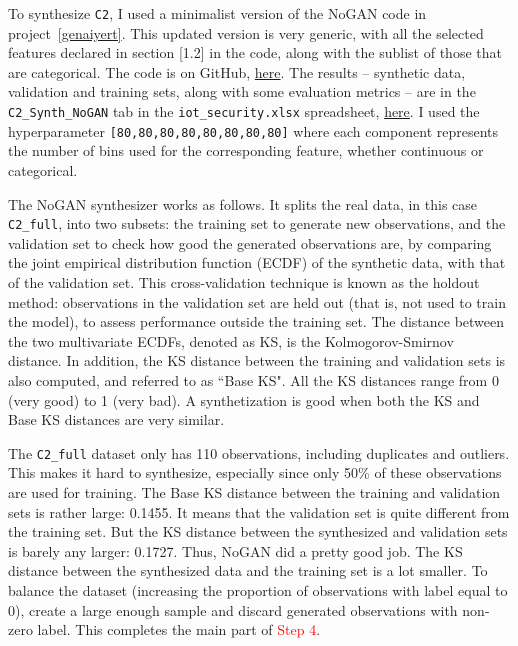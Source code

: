 \documentclass[oneside,10pt]{book}
\begin{document}
To synthesize \texttt{C2}, I used a minimalist version of the NoGAN code in project~\ref{genaiyert}. This updated version is very generic,
 with all the selected features declared in section [1.2] in the code, along with the sublist of those that are categorical. 
  The code is on GitHub, \href{https://github.com/VincentGranville/Main/blob/main/NoGAN_iot.py}{here}.
 The results -- synthetic data, validation and training sets, along with some evaluation metrics -- are
 in the \texttt{C2\_Synth\_NoGAN} tab 
 in the \texttt{iot\_security.xlsx} spreadsheet,
 \href{https://github.com/VincentGranville/Main/blob/main/iot_security.xlsx}{here}. 
I used the \textcolor{index}{hyperparameter} 
\texttt{[80,80,80,80,80,80,80,80]} where each component represents the number of bins used for the corresponding feature,
 whether continuous or categorical.

The NoGAN synthesizer works as follows. It splits the real data, in this case 
\texttt{C2\_full}, into two subsets: the \textcolor{index}{training set} to generate
 new observations, and the \textcolor{index}{validation set} to check how good the generated observations are, by comparing the \textcolor{index}{joint empirical distribution function} (ECDF) of the synthetic data, with that of the validation set. This
 \textcolor{index}{cross-validation} technique is known as the 
\textcolor{index}{holdout method}: observations in the validation set are held out (that is, not used to train the model),
 to assess performance outside the training set. The distance between the two multivariate ECDFs, denoted as KS, 
 is the \textcolor{index}{Kolmogorov-Smirnov distance}. In addition, the KS distance between
 the training and validation sets is also computed, and referred to as ``Base KS". All the KS distances range from 0 (very good) to 1 (very bad).
 A synthetization is good when both the KS and Base KS distances are very similar.

The \texttt{C2\_full} dataset only has 110 observations, including duplicates and outliers. This makes it hard to synthesize, especially since only 50\% of these observations are used for training. The Base KS distance between the training and validation sets is rather large: 0.1455. It means that the validation set is quite different from the training set. But the KS distance between the synthesized and validation sets is barely any larger: 0.1727. Thus, NoGAN did a pretty good job. The KS distance between the synthesized data and the training set is a lot smaller. To balance the dataset (increasing the proportion of observations with label equal to 0), create a large enough sample and discard generated observations with non-zero label. This completes the main part of
 \textcolor{red}{Step 4}.
\end{document}
